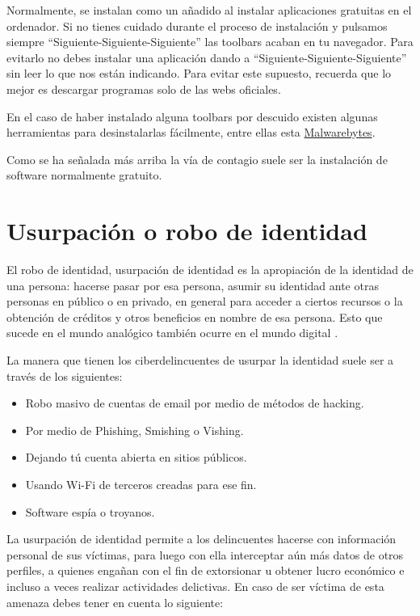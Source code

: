 \documentclass[
  spanish,
  a4paper,
  openany]{book}
\begin{document}
Normalmente, se instalan como un añadido al instalar aplicaciones gratuitas en el ordenador. Si no tienes cuidado durante el proceso de instalación y pulsamos siempre ``Siguiente-Siguiente-Siguiente'' las toolbars acaban en tu navegador. Para evitarlo no debes instalar una aplicación dando a ``Siguiente-Siguiente-Siguiente'' sin leer lo que nos están indicando. Para evitar este supuesto, recuerda que lo mejor es descargar programas solo de las webs oficiales.

En el caso de haber instalado alguna toolbars por descuido existen algunas herramientas para desinstalarlas fácilmente, entre ellas esta \href{https://es.malwarebytes.com/adwcleaner/}{Malwarebytes}.

Como se ha señalada más arriba la vía de contagio suele ser la instalación de software normalmente gratuito.

\hypertarget{usurpaciuxf3n-o-robo-de-identidad}{%
\section{Usurpación o robo de identidad}\label{usurpaciuxf3n-o-robo-de-identidad}}

El robo de identidad, usurpación de identidad es la apropiación de la identidad de una persona: hacerse pasar por esa persona, asumir su identidad ante otras personas en público o en privado, en general para acceder a ciertos recursos o la obtención de créditos y otros beneficios en nombre de esa persona. Esto que sucede en el mundo analógico también ocurre en el mundo digital \citep{WIKI-usurpacion}.

La manera que tienen los ciberdelincuentes de usurpar la identidad suele ser a través de los siguientes:

\begin{itemize}
\item
  Robo masivo de cuentas de email por medio de métodos de hacking.
\item
  Por medio de Phishing, Smishing o Vishing.
\item
  Dejando tú cuenta abierta en sitios públicos.
\item
  Usando Wi-Fi de terceros creadas para ese fin.
\item
  Software espía o troyanos.
\end{itemize}

La usurpación de identidad permite a los delincuentes hacerse con información personal de sus víctimas, para luego con ella interceptar aún más datos de otros perfiles, a quienes engañan con el fin de extorsionar u obtener lucro económico e incluso a veces realizar actividades delictivas.
En caso de ser víctima de esta amenaza debes tener en cuenta lo siguiente:
\end{document}
